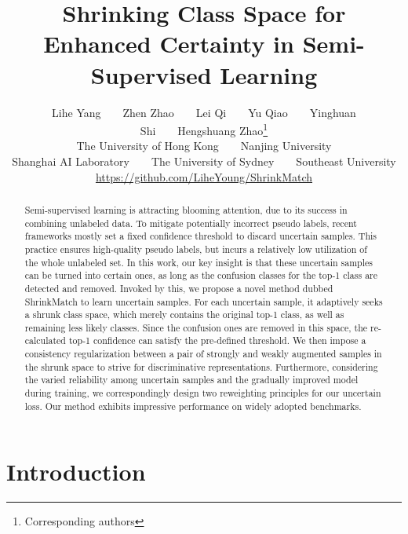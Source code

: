 \documentclass[10pt,twocolumn,letterpaper]{article}
\begin{document}
\title{Shrinking Class Space for Enhanced Certainty in Semi-Supervised Learning}

\author{Lihe Yang~~~~Zhen Zhao~~~~Lei Qi~~~~Yu Qiao~~~~Yinghuan Shi\hspace{0.2mm}~~~~Hengshuang Zhao\thanks{Corresponding authors}\vspace{1mm}\\
The University of Hong Kong~~~~Nanjing University\\Shanghai AI Laboratory~~~~The University of Sydney~~~~Southeast University\\
\small{\url{https://github.com/LiheYoung/ShrinkMatch}}
}


\maketitle
\ificcvfinal\thispagestyle{empty}\fi

\begin{abstract}
    Semi-supervised learning is attracting blooming attention, due to its success in combining unlabeled data. To mitigate potentially incorrect pseudo labels, recent frameworks mostly set a fixed confidence threshold to discard uncertain samples. This practice ensures high-quality pseudo labels, but incurs a relatively low utilization of the whole unlabeled set. In this work, our key insight is that these uncertain samples can be turned into certain ones, as long as the confusion classes for the top-1 class are detected and removed. Invoked by this, we propose a novel method dubbed ShrinkMatch to learn uncertain samples. For each uncertain sample, it adaptively seeks a shrunk class space, which merely contains the original top-1 class, as well as remaining less likely classes. Since the confusion ones are removed in this space, the re-calculated top-1 confidence can satisfy the pre-defined threshold. We then impose a consistency regularization between a pair of strongly and weakly augmented samples in the shrunk space to strive for discriminative representations. Furthermore, considering the varied reliability among uncertain samples and the gradually improved model during training, we correspondingly design two reweighting principles for our uncertain loss. Our method exhibits impressive performance on widely adopted benchmarks.
\end{abstract}
 \section{Introduction}
\end{document}
